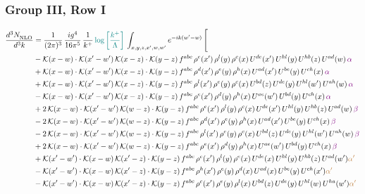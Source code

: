 \documentclass[9pt]{article}
\numberwithin{equation}{section}
\begin{document}
\subsubsection{Group III, Row I}
\begin{align}
     \frac{d^{3}N_{\rm NLO}^{\rm}}{d^{3}k}  & = \frac{1}{(2\pi)^{3}}\, \frac{ig^{4}}{16\pi^{5}}\, \frac{1}{k^{+}}\, {\color{teal}\log{\left[\frac{k^{+}}{\Lambda}\right]}}\, \int_{x,y,z,x^{\prime},w,w^{\prime}}e^{-ik(w^{\prime}-w)}\, \Bigg[\notag \\ & -\mathcal{K}(x-w)\cdot \mathcal{K}(x'-w')\, \mathcal{K}(x-z)\cdot \mathcal{K}(y-z)\, f^{abc}\, \rho^{e}(x')\,\rho^{l}(y)\,\rho^{c}(x)\,U^{de}(x')\,U^{hl}(y)\,U^{hb}(z)\,U^{ad}(w)\, {\color{violet}\alpha} \notag \\ & +\mathcal{K}(x-w)\cdot \mathcal{K}(x'-w')\, \mathcal{K}(x-z)\cdot \mathcal{K}(y-z)\, f^{abc}\, \rho^{d}(x')\,\rho^{e}(y)\,\rho^{h}(x)\,U^{ad}(x')\,U^{be}(y)\,U^{ch}(x)\, {\color{violet}\alpha} \notag \\ & + \mathcal{K}(x-w)\cdot \mathcal{K}(x'-w')\, \mathcal{K}(x-z)\cdot \mathcal{K}(y-z)\, f^{abc}\, \rho^{l}(x')\,\rho^{e}(y)\,\rho^{c}(x)\,U^{bd}(z)\,U^{de}(y)\,U^{hl}(w')\,U^{ah}(w)\, {\color{violet}\alpha} \notag \\ & -\mathcal{K}(x-w)\cdot \mathcal{K}(x'-w')\, \mathcal{K}(x-z)\cdot \mathcal{K}(y-z)\, f^{abc}\, \rho^{e}(x')\,\rho^{d}(y)\,\rho^{h}(x)\,U^{ae}(w')\,U^{bd}(y)\,U^{ch}(x)\, {\color{violet}\alpha} \notag \\ & +2\, \mathcal{K}(x-w)\cdot \mathcal{K}(x'-w')\, \mathcal{K}(w-z) \cdot \mathcal{K}(y-z)\, f^{abc}\, \rho^{e}(x')\,\rho^{l}(y)\, \rho^{c}(x)\, U^{de}(x')\,U^{hl}(y)\,U^{hb}(z)\,U^{ad}(w)\, {\color{violet} \beta} \notag \\ & -2\, \mathcal{K}(x-w)\cdot \mathcal{K}(x'-w')\, \mathcal{K}(w-z) \cdot \mathcal{K}(y-z)\, f^{abc}\, \rho^{d}(x')\,\rho^{e}(y)\, \rho^{h}(x)\, U^{ad}(x')\,U^{be}(y)\,U^{ch}(x)\, {\color{violet} \beta}\notag \\ & -2\, \mathcal{K}(x-w)\cdot \mathcal{K}(x'-w')\, \mathcal{K}(w-z) \cdot \mathcal{K}(y-z)\, f^{abc}\, \rho^{l}(x')\,\rho^{e}(y)\, \rho^{c}(x)\, U^{bd}(z)\,U^{de}(y)\,U^{hl}(w')\,U^{ah}(w)\, {\color{violet} \beta}\notag \\ & + 2\, \mathcal{K}(x-w)\cdot \mathcal{K}(x'-w')\, \mathcal{K}(w-z) \cdot \mathcal{K}(y-z)\, f^{abc}\, \rho^{e}(x')\,\rho^{d}(y)\, \rho^{h}(x)\, U^{ae}(w')\,U^{bd}(y)\,U^{ch}(x)\, {\color{violet} \beta}\notag \\ & +\mathcal{K}(x'-w')\cdot\mathcal{K}(x-w)\,\mathcal{K}(x'-z)\cdot\mathcal{K}(y-z)\, f^{abc}\,\rho^{c}(x')\,\rho^{l}(y)\,\rho^{e}(x)\,U^{de}(x)\,U^{hl}(y)\,U^{hb}(z)\,U^{ad}(w'){\color{brown} \alpha'}\notag\\ &-\mathcal{K}(x'-w')\cdot\mathcal{K}(x-w)\,\mathcal{K}(x'-z)\cdot\mathcal{K}(y-z)\, f^{abc}\,\rho^{h}(x')\,\rho^{e}(y)\,\rho^{d}(x)\,U^{ad}(x)\,U^{be}(y)\,U^{ch}(x'){\color{brown} \alpha'}\notag\\ &-\mathcal{K}(x'-w')\cdot\mathcal{K}(x-w)\,\mathcal{K}(x'-z)\cdot\mathcal{K}(y-z)\, f^{abc}\,\rho^{c}(x')\,\rho^{e}(y)\,\rho^{l}(x)\,U^{bd}(z)\,U^{de}(y)\,U^{hl}(w)\,U^{ha}(w'){\color{brown} \alpha'}\notag \\ 
\end{align}
\end{document}
